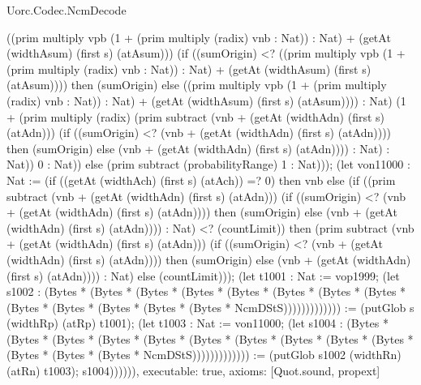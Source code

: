 \begin{lexlean}{Uorc.Codec.NcmDecode}
\begin{semanticmodule}
{((prim multiply vpb (1 + (prim multiply (radix) vnb : Nat)) : Nat) + (getAt (widthAsum) (first s) (atAsum))) (if ((sumOrigin) <? ((prim multiply vpb (1 + (prim multiply (radix) vnb : Nat)) : Nat) + (getAt (widthAsum) (first s) (atAsum)))) then (sumOrigin) else ((prim multiply vpb (1 + (prim multiply (radix) vnb : Nat)) : Nat) + (getAt (widthAsum) (first s) (atAsum)))) : Nat) (1 + (prim multiply (radix) (prim subtract (vnb + (getAt (widthAdn) (first s) (atAdn))) (if ((sumOrigin) <? (vnb + (getAt (widthAdn) (first s) (atAdn)))) then (sumOrigin) else (vnb + (getAt (widthAdn) (first s) (atAdn)))) : Nat) : Nat)) 0 : Nat)) else (prim subtract (probabilityRange) 1 : Nat))); (let von11000 : Nat := (if ((getAt (widthAch) (first s) (atAch)) =? 0) then vnb else (if ((prim subtract (vnb + (getAt (widthAdn) (first s) (atAdn))) (if ((sumOrigin) <? (vnb + (getAt (widthAdn) (first s) (atAdn)))) then (sumOrigin) else (vnb + (getAt (widthAdn) (first s) (atAdn)))) : Nat) <? (countLimit)) then (prim subtract (vnb + (getAt (widthAdn) (first s) (atAdn))) (if ((sumOrigin) <? (vnb + (getAt (widthAdn) (first s) (atAdn)))) then (sumOrigin) else (vnb + (getAt (widthAdn) (first s) (atAdn)))) : Nat) else (countLimit))); (let t1001 : Nat := vop1999; (let s1002 : (Bytes * (Bytes * (Bytes * (Bytes * (Bytes * (Bytes * (Bytes * (Bytes * (Bytes * (Bytes * (Bytes * (Bytes * (Bytes * NcmDStS))))))))))))) := (putGlob s (widthRp) (atRp) t1001); (let t1003 : Nat := von11000; (let s1004 : (Bytes * (Bytes * (Bytes * (Bytes * (Bytes * (Bytes * (Bytes * (Bytes * (Bytes * (Bytes * (Bytes * (Bytes * (Bytes * NcmDStS))))))))))))) := (putGlob s1002 (widthRn) (atRn) t1003); s1004)))))),
  executable: true,
  axioms: [Quot.sound, propext]
}


\end{semanticmodule}
\end{lexlean}
